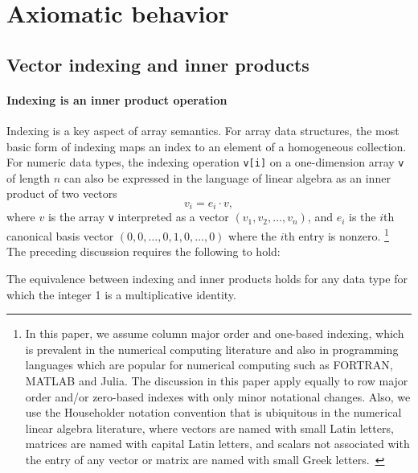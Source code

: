 \section{Axiomatic behavior}

\subsection{Vector indexing and inner products}

\paragraph{Indexing is an inner product operation}
Indexing is a key aspect of array semantics. For array data structures, the
most basic form of indexing maps an index to an element of a homogeneous
collection. For numeric data types, the indexing operation \lstinline|v[i]| on
a one-dimension array \lstinline|v| of length $n$ can also be expressed in the
language of linear algebra as an inner product of two vectors
\begin{equation}
	v_i = e_i \cdot v,\label{eq:idx1}
\end{equation}
where $v$ is the array \lstinline|v| interpreted as a vector $(v_1, v_2, \dots,
v_n)$, and $e_i$ is the $i$th canonical basis vector $(0, 0, \dots, 0, 1, 0,
\dots, 0)$ where the $i$th entry is nonzero.%
\footnote{In this paper, we assume column major order and one-based indexing,
which is prevalent in the numerical computing literature and also in
programming languages which are popular for numerical computing such as
FORTRAN, MATLAB and Julia. The discussion in this paper apply equally to row
major order and/or zero-based indexes with only minor notational changes. Also,
we use the Householder notation convention that is ubiquitous in the numerical
linear algebra literature, where vectors are named with small Latin letters,
matrices are named with capital Latin letters, and scalars not associated with
the entry of any vector or matrix are named with small Greek
letters.~\cite{Householder1964}}
The preceding discussion requires the following to hold:

The equivalence between indexing and inner products holds for
		any data type for which the integer 1 is a multiplicative
		identity.
%
%


